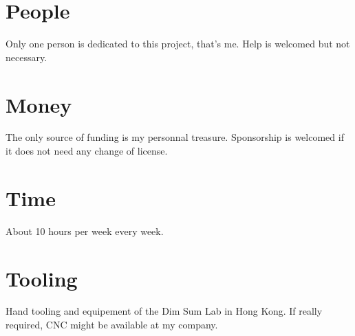 \documentclass[oneside, DIV=11]{scrreprt}
\begin{document}
    \section{People}
    Only one person is dedicated to this project, that's me. Help is welcomed but not necessary.
    
    \section{Money}
    The only source of funding is my personnal treasure. Sponsorship is 
    welcomed if it does not need any change of license.
    
    \section{Time}
    About 10 hours per week every week.

    \section{Tooling}
    Hand tooling and equipement of the Dim Sum Lab in Hong Kong. If really required, CNC might be available at my company.






\label{LastPage}
\end{document}
